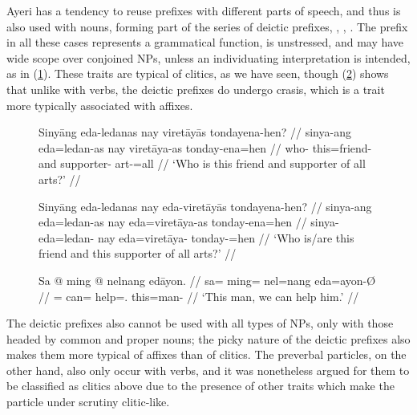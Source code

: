 \label{clitics_prenoun_dem}
Ayeri has a tendency to reuse prefixes with different parts of speech, and thus
 is also used with nouns, forming part of the series of deictic
prefixes, , ,
. The prefix in all these cases represents a grammatical
function, is unstressed, and may have wide scope over conjoined NPs, unless an
individuating interpretation is intended, as in (\ref{ex:clitics_21b}). These
traits are typical of clitics, as we have seen, though (\ref{ex:clitics_22})
shows that unlike with verbs, the deictic prefixes do undergo crasis, which is
a trait more typically associated with affixes.

\begin{figure}[h]
\pex\label{ex:clitics_21}
\a\label{ex:clitics_21a}\begingl
	\gla Sinyāng eda-ledanas nay viretāyās tondayena-hen? //
	\glb sinya-ang eda=ledan-as nay viretāya-as tonday-ena=hen //
	\glc who-\Aarg{} this=friend-\Parg{} and supporter-\Parg{} 
		art-\Gen{}=all //
	\glft `Who is this friend and supporter of all arts?' //
\endgl

\a\label{ex:clitics_21b}\begingl
	\gla Sinyāng eda-ledanas nay eda-viretāyās tondayena-hen? //
	\glb sinya-ang eda=ledan-as nay eda=viretāya-as tonday-ena=hen //
	\glc sinya-\Aarg{} eda=ledan-\Parg{} nay eda=viretāya-\Parg{} 
		tonday-\Gen{}=hen //
	\glft `Who is/are this friend and this supporter of all arts?' //
\endgl
\xe
\end{figure}

\begin{figure}[h]
\ex\label{ex:clitics_22}\begingl
	\gla Sa @ ming @ nelnang edāyon. //
	\glb sa= ming= nel=nang eda=ayon-Ø //
	\glc \Parg{}= can= help=\Fpl{}.\Aarg{} this=man-\Top{} //
	\glft `This man, we can help him.' //
\endgl\xe
\end{figure}

The deictic prefixes also cannot be used with all types of NPs, only with those
headed by common and proper nouns; the picky nature of the deictic prefixes
also makes them more typical of affixes than of clitics. The preverbal
particles, on the other hand, also only occur with verbs, and it was
nonetheless argued for them to be classified as clitics above due to the
presence of other traits which make the particle under scrutiny clitic-like.

